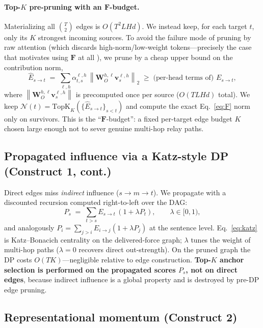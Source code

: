 \documentclass[11pt]{article}
\newcommand{\F}{\mathbf{F}}
\newcommand{\WO}{\mathbf{W}_O}
\newcommand{\vv}{\mathbf{v}}
\newcommand{\norm}[1]{\left\lVert #1 \right\rVert}
\newcommand{\TopK}{\mathrm{TopK}}
\begin{document}
\paragraph{Top-$K$ pre-pruning with an $\F$-budget.}
Materializing all $\binom{T}{2}$ edges is $O(T^2 L H d)$. We instead keep, for each target $t$,
only its $K$ strongest incoming sources. To avoid the failure mode of pruning by raw attention
(which discards high-norm/low-weight tokens---precisely the case that motivates using $\F$ at
all \cite{guo2024attention}), we prune by a cheap upper bound on the contribution norm,
\begin{equation}
\widehat{E}_{s\to t} \;=\; \sum_{\ell,h}\alpha^{\ell,h}_{t,s}\,\norm{\WO^{h,\ell}\vv^{\ell,h}_s}_2
\;\ge\; \text{(per-head terms of) } E_{s\to t},
\label{eq:budget}
\end{equation}
where $\norm{\WO^{h,\ell}\vv^{\ell,h}_s}$ is precomputed once per source ($O(T L H d)$ total).
We keep $\mathcal{N}(t)=\TopK_K(\{\widehat E_{s\to t}\}_{s<t})$ and compute the exact
Eq.~\eqref{eq:F} norm only on survivors. This is the ``$\F$-budget'': a fixed per-target edge
budget $K$ chosen large enough not to sever genuine multi-hop relay paths.

\subsection{Propagated influence via a Katz-style DP (Construct 1, cont.)}

Direct edges miss \emph{indirect} influence ($s\to m\to t$). We propagate with a discounted
recursion computed right-to-left over the DAG:
\begin{equation}
P_s \;=\; \sum_{t>s} E_{s\to t}\,(1+\lambda P_t),\qquad \lambda\in[0,1),
\label{eq:katz}
\end{equation}
and analogously $P_i=\sum_{j>i}E_{i\to j}(1+\lambda P_j)$ at the sentence level. Eq.~\eqref{eq:katz}
is Katz--Bonacich centrality \cite{katz1953new} on the delivered-force graph; $\lambda$ tunes the
weight of multi-hop paths ($\lambda=0$ recovers direct out-strength). On the pruned graph the DP
costs $O(TK)$---negligible relative to edge construction. \textbf{Top-$K$ anchor selection is
performed on the propagated scores $P_s$, not on direct edges}, because indirect influence is a
global property and is destroyed by pre-DP edge pruning.

\subsection{Representational momentum (Construct 2)}
\end{document}
